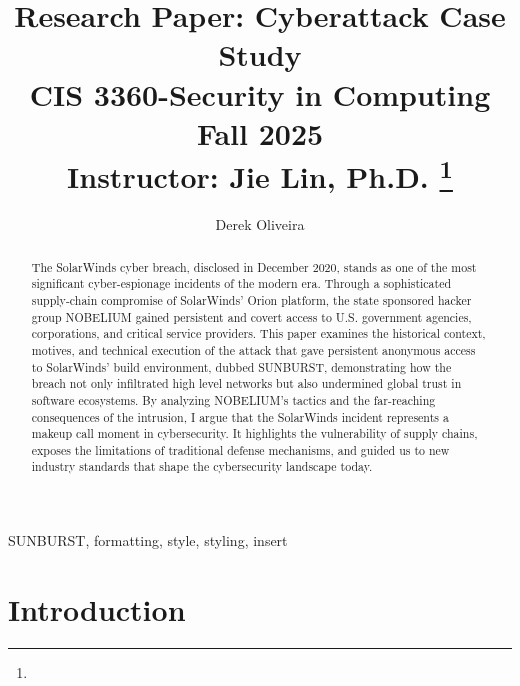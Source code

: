 \documentclass[conference]{IEEEtran}
\begin{document}
\title{Research Paper: Cyberattack Case Study \\CIS 3360-Security in Computing\\Fall 2025\\
{\footnotesize Instructor: Jie Lin, Ph.D.}
\thanks{}
}

\author{{ Derek Oliveira}\\
}

\maketitle

\begin{abstract}
The SolarWinds cyber breach, disclosed in December 2020, stands as one of the most significant cyber-espionage
incidents of the modern era. Through a sophisticated supply-chain compromise of SolarWinds' Orion platform, 
the state sponsored hacker group NOBELIUM gained persistent and covert access to U.S. government agencies,
corporations, and critical service providers. This paper examines the historical context, motives, and technical execution
of the attack that gave persistent anonymous access to SolarWinds' build environment, dubbed SUNBURST, demonstrating how the breach not 
only infiltrated high level networks but also undermined global trust in software ecosystems. By analyzing
NOBELIUM's tactics and the far-reaching consequences of the intrusion, I argue that the SolarWinds incident
represents a makeup call moment in cybersecurity. It highlights the vulnerability of supply chains, exposes
the limitations of traditional defense mechanisms, and guided us to new industry standards that shape the cybersecurity
landscape today. 
\end{abstract}

\begin{IEEEkeywords}
SUNBURST, formatting, style, styling, insert
\end{IEEEkeywords}

\section{Introduction}

\end{document}
